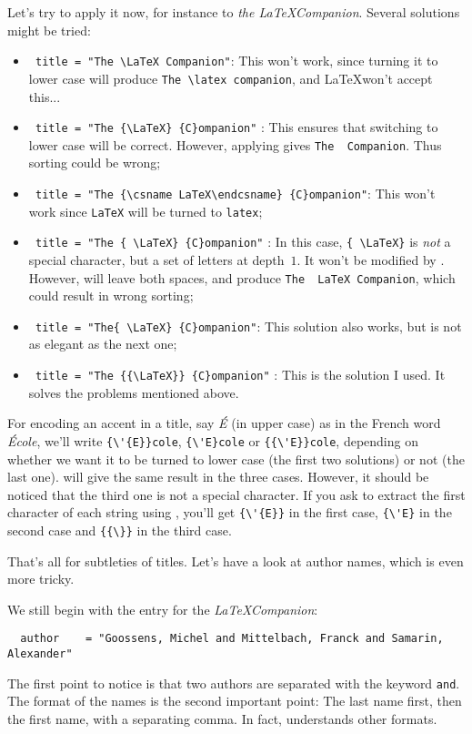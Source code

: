 Let's try to apply it now, 
for instance to \emph{the \LaTeX Companion}. 
Several solutions might be tried:
\begin{itemize}
\item \verb+ title = "The \LaTeX Companion"+: This won't work, since
  turning it to lower case will produce \verb+The \latex companion+,
  and 
  \LaTeX won't accept this...
\item \verb+ title = "The {\LaTeX} {C}ompanion"+ : This ensures that
  switching to lower case will be correct. However, applying
   gives  \verb+The  Companion+. Thus sorting could be
  wrong; 
\item \verb+ title = "The {\csname LaTeX\endcsname} {C}ompanion"+:
  This won't work since \texttt{LaTeX} will be turned to \texttt{latex};
\item \verb+ title = "The { \LaTeX} {C}ompanion"+ : In this case,
  \verb+{ \LaTeX}+ is \emph{not} a special character, but a set of
  letters at depth~$1$. It won't be modified by
  . However,  will leave both spaces, and
  produce \verb+The  LaTeX Companion+, which could result in wrong
  sorting;
\item \verb+ title = "The{ \LaTeX} {C}ompanion"+: This solution also
  works, but is not as elegant as the next one;
\item \verb+ title = "The {{\LaTeX}} {C}ompanion"+ : This is the
  solution I used. It solves the problems mentioned above.
\end{itemize}

For encoding an accent in a title, say \emph{\'E} (in upper case) as
in the French word \emph{\'Ecole}, we'll write 
\verb+{\'{E}}cole+, \verb+{\'E}cole+ or \verb+{{\'E}}cole+,
depending on whether we want it to be turned to lower case (the first
two solutions) or not (the last one).  will give the same
result in the three cases.
However, it should be noticed that the third one is not a special
character. If you ask \bt to extract the first character of each
string using , you'll get \verb+{\'{E}}+ in the first case,
\verb+{\'E}+ in the second case  and 
\verb+{{\}}+ in the third case. 


That's all for subtleties of titles. Let's have a look at author
names, which is even more tricky.


\label{author}


We still begin with the entry for the \emph{\LaTeX Companion}: 
\begin{verbatim}
  author 	= "Goossens, Michel and Mittelbach, Franck and Samarin, Alexander"
\end{verbatim}
The first point to notice is that two authors are separated with the
keyword  \texttt{and}. The format of the names is
the second important point: The last name first, then the first name, 
with a separating comma. In fact, \bt understands other formats.

